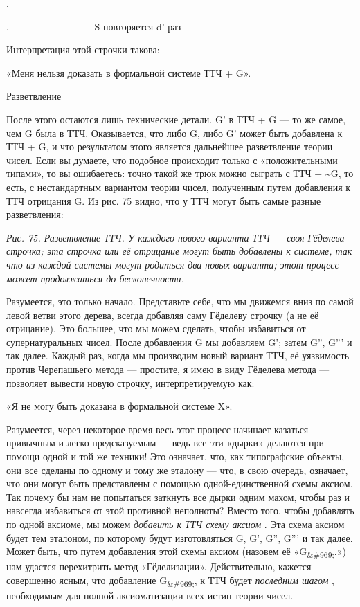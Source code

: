 \documentclass[../main.tex]{subfiles}
\begin{document}
.~~~~~~~~~~~~~~~~~~~~~~~ \textbar\_\_\_\_\_\_\textbar{}

.~~~~~~~~~~~~~~~~~ S повторяется d' раз

Интерпретация этой строчки такова:

«Меня нельзя доказать в формальной системе ТТЧ + G».

Разветвление

После этого остаются лишь технические детали. G' в ТТЧ + G --- то же самое, чем G была в ТТЧ\@. Оказывается, что либо G, либо G' может быть добавлена к ТТЧ + G, и что результатом этого является дальнейшее разветвление теории чисел. Если вы думаете, что подобное происходит только с «положительными типами», то вы ошибаетесь: точно такой же трюк можно сыграть с ТТЧ + \textasciitilde G, то есть, с нестандартным вариантом теории чисел, полученным путем добавления к ТТЧ отрицания G. Из рис. 75 видно, что у ТТЧ могут быть самые разные разветвления:

\emph{Рис. 75. Разветвление ТТЧ\@. У каждого нового варианта ТТЧ --- своя Гёделева строчка; эта строчка или её отрицание могут быть добавлены к системе, так что из каждой системы могут родиться два новых варианта; этот процесс может продолжаться до бесконечности.}

Разумеется, это только начало. Представьте себе, что мы движемся вниз по самой левой ветви этого дерева, всегда добавляя саму Гёделеву строчку (а не её отрицание). Это большее, что мы можем сделать, чтобы избавиться от супернатуральных чисел. После добавления G мы добавляем G'; затем G'', G''' и так далее. Каждый раз, когда мы производим новый вариант ТТЧ, её уязвимость против Черепашьего метода --- простите, я имею в виду Гёделева метода --- позволяет вывести новую строчку, интерпретируемую как:

«Я не могу быть доказана в формальной системе X».

Разумеется, через некоторое время весь этот процесс начинает казаться привычным и легко предсказуемым --- ведь все эти «дырки» делаются при помощи одной и той же техники! Это означает, что, как типографские объекты, они все сделаны по одному и тому же эталону --- что, в свою очередь, означает, что они могут быть представлены с помощью одной-единственной схемы аксиом. Так почему бы нам не попытаться заткнуть все дырки одним махом, чтобы раз и навсегда избавиться от этой противной неполноты? Вместо того, чтобы добавлять по одной аксиоме, мы можем \emph{добавить к ТТЧ схему аксиом} . Эта схема аксиом будет тем эталоном, по которому будут изготовляться G, G', G'', G''' и так далее. Может быть, что путем добавления этой схемы аксиом (назовем её «G\textsubscript{\&\#969;}.») нам удастся перехитрить метод «Гёделизации». Действительно, кажется совершенно ясным, что добавление G\textsubscript{\&\#969;}, к ТТЧ будет \emph{последним шагом} , необходимым для полной аксиоматизации всех истин теории чисел.
\end{document}
